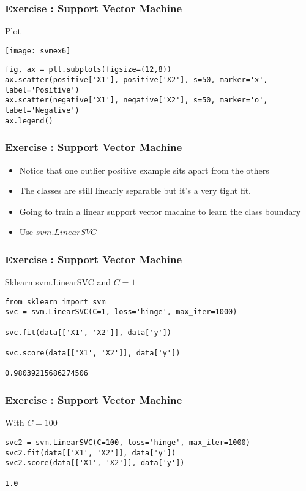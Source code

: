 \begin{frame}[fragile]\frametitle{Exercise : Support Vector Machine}
Plot

\begin{center}
\texttt{[image: svmex6]}
\end{center}


\begin{lstlisting}
fig, ax = plt.subplots(figsize=(12,8))
ax.scatter(positive['X1'], positive['X2'], s=50, marker='x', label='Positive')
ax.scatter(negative['X1'], negative['X2'], s=50, marker='o', label='Negative')
ax.legend()
\end{lstlisting}

\end{frame}

\begin{frame}[fragile]\frametitle{Exercise : Support Vector Machine}
\begin{itemize}
\item  Notice that one outlier positive example sits apart from the others
\item The classes are still linearly separable but it's a very tight fit. 
\item Going to train a linear support vector machine to learn the class boundary
\item Use $svm.LinearSVC$ 
\end{itemize}
\end{frame}

\begin{frame}[fragile]\frametitle{Exercise : Support Vector Machine}
Sklearn  svm.LinearSVC and $C=1$
\begin{lstlisting}
from sklearn import svm
svc = svm.LinearSVC(C=1, loss='hinge', max_iter=1000)

svc.fit(data[['X1', 'X2']], data['y'])

svc.score(data[['X1', 'X2']], data['y'])

0.98039215686274506
\end{lstlisting}

\end{frame}

\begin{frame}[fragile]\frametitle{Exercise : Support Vector Machine}
With $C=100$
\begin{lstlisting}
svc2 = svm.LinearSVC(C=100, loss='hinge', max_iter=1000)
svc2.fit(data[['X1', 'X2']], data['y'])
svc2.score(data[['X1', 'X2']], data['y'])

1.0
\end{lstlisting}

\end{frame}

